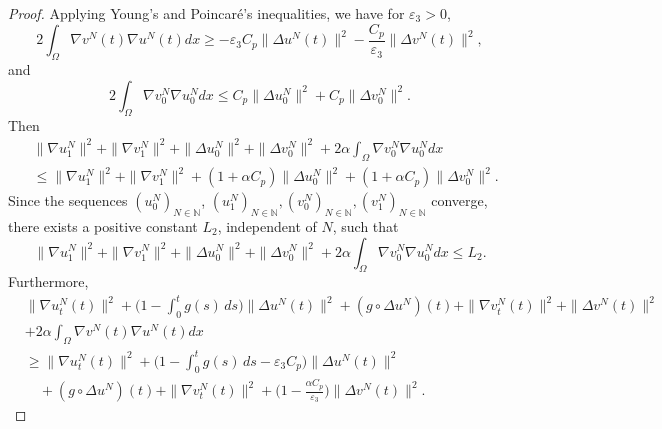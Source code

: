 \documentclass[10pt,a4paper]{amsart}
\numberwithin{equation}{section}
\begin{document}
\begin{proof}
Applying Young's and Poincar\'e's inequalities, we have for $\varepsilon_{3}> 0$,
 \begin{equation*}
 2\int_{\Omega} \nabla v^N(t) \nabla u^N(t) dx
 \geq - \varepsilon_{3} C_p\| \Delta u^N(t) \|^2 - \frac{C_p}{\varepsilon_{3}}\| \Delta v^N(t) \|^2,
 \end{equation*}
and
\[
 2 \int_{\Omega} \nabla v^N_0 \nabla u^N_0 dx
 \leq C_p\| \Delta u^N_0 \|^2 +C_p \| \Delta v^N_0 \|^2.
\]
Then
\begin{equation}
\begin{aligned}
& \| \nabla u^N_{1} \|^2+ \| \nabla v^N_{1} \|^2+\| \Delta u^N_0 \|^2
 + \| \Delta v^N_0 \|^2 +2 \alpha \int_{\Omega} \nabla v^N_0 \nabla u^N_0 dx \\
&\leq \| \nabla u^N_{1} \|^2+ \| \nabla v^N_{1} \|^2
 +(1+\alpha C_p) \| \Delta u^N_0 \|^2
 +(1+\alpha C_p)\| \Delta v^N_0 \|^2.
\end{aligned} \label{e3.16}
\end{equation}
Since the sequences $ (u_0^N)_{N \in \mathbb{N}}$,
$ (u_1^N)_{N \in \mathbb{N}}, (v_0^N)_{N \in \mathbb{N}}, (v_1^N)_{N \in \mathbb{N}} $
converge, there exists a positive constant $L_2$, independent of $N$, such that
\begin{equation}
 \| \nabla u^N_{1} \|^2+ \| \nabla v^N_{1} \|^2
 +\| \Delta u^N_0 \|^2 + \| \Delta v^N_0 \|^2
 +2 \alpha \int_{\Omega} \nabla v^N_0 \nabla u^N_0 dx\leq L_2. \label{e3.17}
\end{equation}
Furthermore,
\begin{align*}
&\| \nabla u^N_{t}(t) \|^2+\Big( 1 - \int_0^t g(s)\,ds \Big) \| \Delta u^N(t) \|^2
 + (g \circ \Delta u^N)(t) + \| \nabla v^N_{t}(t) \|^2+ \| \Delta v^N (t)\|^2 \\
&+2 \alpha \int_{\Omega} \nabla v^N (t)\nabla u^N(t) dx \\
&\geq \| \nabla u^N_{t}(t) \|^2+\Big( 1 - \int_0^t g(s)\,ds
 - \varepsilon_{3} C_p \Big) \| \Delta u^N(t) \|^2 \\
&\quad + (g \circ \Delta u^N)(t) + \| \nabla v^N_{t}(t) \|^2
 +\Big( 1-\frac{\alpha C_p}{\varepsilon_{3}}\Big) \| \Delta v^N(t) \|^2.
\end{align*}


\end{proof}
\end{document}
